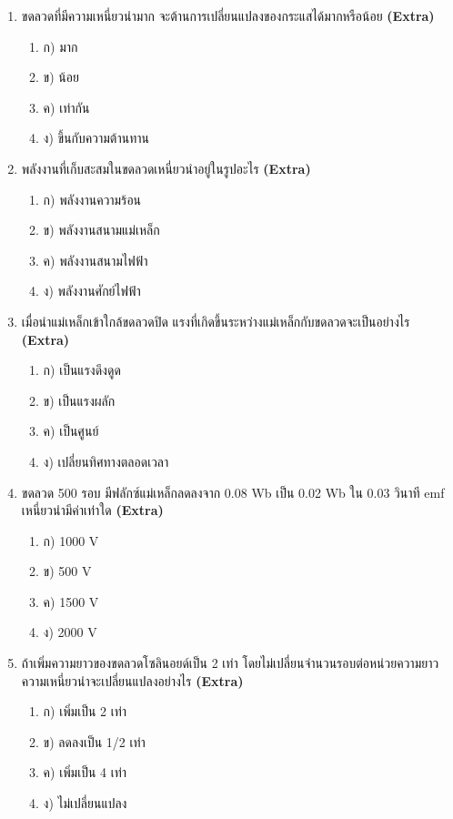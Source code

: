 \documentclass[12pt]{article}
\begin{document}
\begin{enumerate}[label=\arabic*.]
\begin{enumerate}[label=)]
\end{enumerate}
\item ขดลวดที่มีความเหนี่ยวนำมาก จะต้านการเปลี่ยนแปลงของกระแสได้มากหรือน้อย \hfill \textbf{\small (Extra)}
\begin{enumerate}[label=)]
\item ก) มาก
\item ข) น้อย
\item ค) เท่ากัน
\item ง) ขึ้นกับความต้านทาน
\end{enumerate}
\item พลังงานที่เก็บสะสมในขดลวดเหนี่ยวนำอยู่ในรูปอะไร \hfill \textbf{\small (Extra)}
\begin{enumerate}[label=)]
\item ก) พลังงานความร้อน
\item ข) พลังงานสนามแม่เหล็ก
\item ค) พลังงานสนามไฟฟ้า
\item ง) พลังงานศักย์ไฟฟ้า
\end{enumerate}
\item เมื่อนำแม่เหล็กเข้าใกล้ขดลวดปิด แรงที่เกิดขึ้นระหว่างแม่เหล็กกับขดลวดจะเป็นอย่างไร \hfill \textbf{\small (Extra)}
\begin{enumerate}[label=)]
\item ก) เป็นแรงดึงดูด
\item ข) เป็นแรงผลัก
\item ค) เป็นศูนย์
\item ง) เปลี่ยนทิศทางตลอดเวลา
\end{enumerate}
\item ขดลวด 500 รอบ มีฟลักซ์แม่เหล็กลดลงจาก 0.08 Wb เป็น 0.02 Wb ใน 0.03 วินาที emf เหนี่ยวนำมีค่าเท่าใด \hfill \textbf{\small (Extra)}
\begin{enumerate}[label=)]
\item ก) 1000 V
\item ข) 500 V
\item ค) 1500 V
\item ง) 2000 V
\end{enumerate}
\item ถ้าเพิ่มความยาวของขดลวดโซลินอยด์เป็น 2 เท่า โดยไม่เปลี่ยนจำนวนรอบต่อหน่วยความยาว ความเหนี่ยวนำจะเปลี่ยนแปลงอย่างไร \hfill \textbf{\small (Extra)}
\begin{enumerate}[label=)]
\item ก) เพิ่มเป็น 2 เท่า
\item ข) ลดลงเป็น 1/2 เท่า
\item ค) เพิ่มเป็น 4 เท่า
\item ง) ไม่เปลี่ยนแปลง

\end{enumerate}
\end{enumerate}
\end{document}

